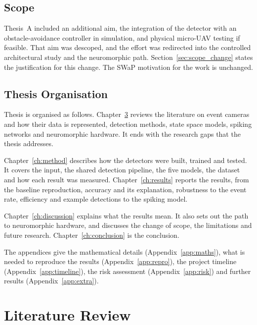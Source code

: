 \documentclass[11pt, a4paper]{report}
\begin{document}
\section{Scope}
\label{sec:scope}
Thesis~A included an additional aim, the integration of the detector with an
obstacle-avoidance controller in simulation, and physical micro-UAV testing if feasible. That
aim was descoped, and the effort was redirected into the controlled architectural study and the
neuromorphic path. Section~\ref{sec:scope_change} states the justification for this change.
The SWaP motivation for the work is unchanged.

\section{Thesis Organisation}
\label{sec:organisation}
Thesis is organised as follows. Chapter~\ref{ch:lit} reviews the literature on event cameras
and how their data is represented, detection methods, state space models, spiking networks and
neuromorphic hardware. It ends with the research gaps that the thesis addresses.

Chapter~\ref{ch:method} describes how the detectors were built, trained and tested. It covers the input, the shared
detection pipeline, the five models, the dataset and how each result was measured.
Chapter~\ref{ch:results} reports the results, from the baseline reproduction, accuracy and its explanation, robustness to the event rate, efficiency and example detections to the spiking model.

Chapter~\ref{ch:discussion} explains what the results mean. It also sets out the path to neuromorphic hardware, and discusses the change of scope, the
limitations and future research. Chapter~\ref{ch:conclusion} is the conclusion.

The appendices give the mathematical details (Appendix~\ref{app:maths}), what is needed to reproduce the
results (Appendix~\ref{app:repro}), the project timeline (Appendix~\ref{app:timeline}), the risk assessment
(Appendix~\ref{app:risk}) and further results (Appendix~\ref{app:extra}).

\chapter{Literature Review}
\label{ch:lit}
\end{document}
